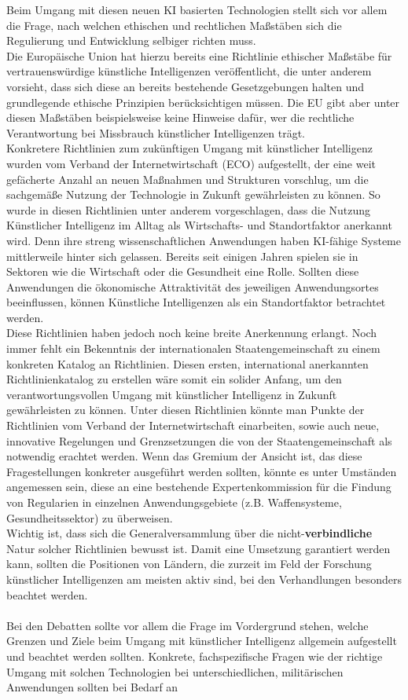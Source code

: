 \documentclass[a4paper,11pt]{article}
\begin{document}
Beim Umgang mit diesen neuen KI basierten Technologien stellt sich vor allem die Frage, nach welchen ethischen und rechtlichen Maßstäben sich die Regulierung und Entwicklung selbiger richten muss. \\ Die Europäische Union hat hierzu bereits eine Richtlinie ethischer Maßstäbe für vertrauenswürdige künstliche Intelligenzen veröffentlicht, die unter anderem vorsieht, dass sich diese an bereits bestehende Gesetzgebungen halten und grundlegende ethische Prinzipien berücksichtigen müssen. Die EU gibt aber unter diesen Maßstäben beispielsweise keine Hinweise dafür, wer die rechtliche Verantwortung bei Missbrauch künstlicher Intelligenzen trägt. \\ Konkretere Richtlinien zum zukünftigen Umgang mit künstlicher Intelligenz wurden vom Verband der Internetwirtschaft (ECO) aufgestellt, der eine weit gefächerte Anzahl an neuen Maßnahmen und Strukturen vorschlug, um die sachgemäße Nutzung der Technologie in Zukunft gewährleisten zu können. So wurde in diesen Richtlinien unter anderem vorgeschlagen, dass die Nutzung Künstlicher Intelligenz im Alltag als Wirtschafts- und Standortfaktor anerkannt wird. Denn ihre streng wissenschaftlichen Anwendungen haben KI-fähige Systeme mittlerweile hinter sich gelassen. Bereits seit einigen Jahren spielen sie in Sektoren wie die Wirtschaft oder die Gesundheit eine Rolle. Sollten diese Anwendungen die ökonomische Attraktivität des jeweiligen Anwendungsortes beeinflussen, können Künstliche Intelligenzen als ein Standortfaktor betrachtet werden. \\ Diese Richtlinien haben jedoch noch keine breite Anerkennung erlangt. Noch immer fehlt ein Bekenntnis der internationalen Staatengemeinschaft zu einem konkreten Katalog an Richtlinien. Diesen ersten, international anerkannten Richtlinienkatalog zu erstellen wäre somit ein solider Anfang, um den verantwortungsvollen Umgang mit künstlicher Intelligenz in Zukunft gewährleisten zu können. Unter diesen Richtlinien könnte man Punkte der Richtlinien vom Verband der Internetwirtschaft einarbeiten, sowie auch neue, innovative Regelungen und Grenzsetzungen die von der Staatengemeinschaft als notwendig erachtet werden. Wenn das Gremium der Ansicht ist, das diese Fragestellungen konkreter ausgeführt werden sollten, könnte es unter Umständen angemessen sein, diese an eine bestehende Expertenkommission für die Findung von Regularien in einzelnen Anwendungsgebiete (z.B. Waffensysteme, Gesundheitssektor) zu überweisen. \\ Wichtig ist, dass sich die Generalversammlung über die nicht-\textbf{verbindliche} Natur solcher Richtlinien bewusst ist. Damit eine Umsetzung garantiert werden kann, sollten die Positionen von Ländern, die zurzeit im Feld der Forschung künstlicher Intelligenzen am meisten aktiv sind, bei den Verhandlungen besonders beachtet werden. \\ \\ Bei den Debatten sollte vor allem die Frage im Vordergrund stehen, welche Grenzen und Ziele beim Umgang mit künstlicher Intelligenz allgemein aufgestellt und beachtet werden sollten. Konkrete, fachspezifische Fragen wie der richtige Umgang mit solchen Technologien bei unterschiedlichen, militärischen Anwendungen sollten bei Bedarf an 
\end{document}
